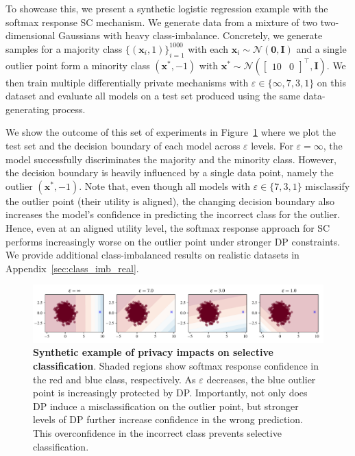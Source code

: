 To showcase this, we present a synthetic logistic regression example with the softmax response SC mechanism. We generate data from a mixture of two two-dimensional Gaussians with heavy class-imbalance. Concretely, we generate samples for a majority class $\{(\bm{x}_i,1)\}_{i=1}^{1000}$ with each $\bm{x}_i \sim \mathcal{N}(\bm{0}, \bm{I})$ and a single outlier point form a minority class $(\bm{x}^*,-1)$ with $\bm{x}^* \sim \mathcal{N}(\begin{bmatrix}10 & 0\end{bmatrix}^\top, \bm{I})$. We then train multiple differentially private mechanisms with $\varepsilon \in \{\infty, 7,3,1\}$  on this dataset and evaluate all models on a test set produced using the same data-generating process.

We show the outcome of this set of experiments in Figure~\ref{fig:eps_gauss} where we plot the test set and the decision boundary of each model across $\varepsilon$ levels. For $\varepsilon = \infty$, the model successfully discriminates the majority and the minority class. However, the decision boundary is heavily influenced by a single data point, namely the outlier $(\bm{x}^*,-1)$. Note that, even though all models with $\varepsilon \in \{7,3,1\}$ misclassify the outlier point (\ie their utility is aligned), the changing decision boundary also increases the model's confidence in predicting the incorrect class for the outlier. Hence, even at an aligned utility level, the softmax response approach for SC performs increasingly worse on the outlier point under stronger DP constraints. We provide additional class-imbalanced results on realistic datasets in Appendix~\ref{sec:class_imb_real}.

\begin{figure}[t]
  \centering
  \includegraphics[width=\linewidth]{figs/sptd_dp/eps_gauss.pdf}
\caption[Synthetic example of privacy impacts on selective classification.]{\textbf{Synthetic example of privacy impacts on selective classification}. Shaded regions show softmax response confidence in the red and blue class, respectively. As $\varepsilon$ decreases, the blue outlier point is increasingly protected by DP. Importantly, not only does DP induce a misclassification on the outlier point, but stronger levels of DP further increase confidence in the wrong prediction. This overconfidence in the incorrect class prevents selective classification.}
\label{fig:eps_gauss}
\end{figure}

